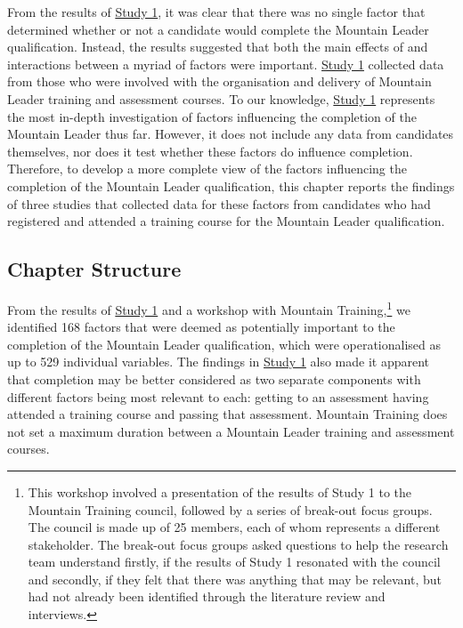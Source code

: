 \documentclass[
  12pt,
  a4paper,
]{book}
\begin{document}
From the results of \protect\hyperlink{ml-qualitative}{Study 1}, it was clear that there was no single factor that determined whether or not a candidate would complete the Mountain Leader qualification. Instead, the results suggested that both the main effects of and interactions between a myriad of factors were important. \protect\hyperlink{ml-qualitative}{Study 1} collected data from those who were involved with the organisation and delivery of Mountain Leader training and assessment courses. To our knowledge, \protect\hyperlink{ml-qualitative}{Study 1} represents the most in-depth investigation of factors influencing the completion of the Mountain Leader thus far. However, it does not include any data from candidates themselves, nor does it test whether these factors do influence completion. Therefore, to develop a more complete view of the factors influencing the completion of the Mountain Leader qualification, this chapter reports the findings of three studies that collected data for these factors from candidates who had registered and attended a training course for the Mountain Leader qualification.

\hypertarget{pra-chapter-structure}{%
\subsection{Chapter Structure}\label{pra-chapter-structure}}

From the results of \protect\hyperlink{ml-qualitative}{Study 1} and a workshop with Mountain Training,\footnote{This workshop involved a presentation of the results of Study 1 to the Mountain Training council, followed by a series of break-out focus groups. The council is made up of 25 members, each of whom represents a different stakeholder. The break-out focus groups asked questions to help the research team understand firstly, if the results of Study 1 resonated with the council and secondly, if they felt that there was anything that may be relevant, but had not already been identified through the literature review and interviews.} we identified 168 factors that were deemed as potentially important to the completion of the Mountain Leader qualification, which were operationalised as up to 529 individual variables. The findings in \protect\hyperlink{ml-qualitative}{Study 1} also made it apparent that completion may be better considered as two separate components with different factors being most relevant to each: getting to an assessment having attended a training course and passing that assessment. Mountain Training does not set a maximum duration between a Mountain Leader training and assessment courses.
\end{document}

